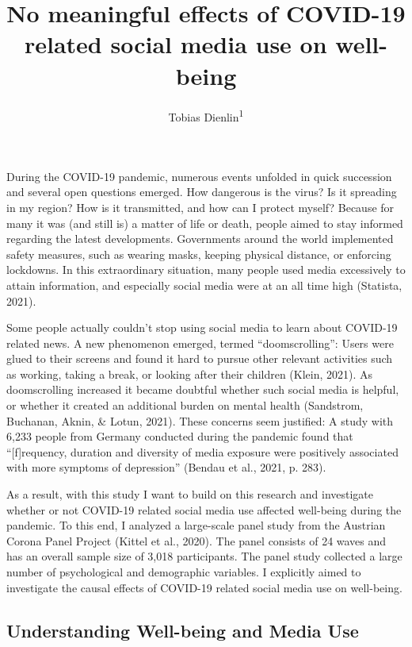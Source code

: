 \documentclass[
  english,
  man,floatsintext]{apa6}
\title{No meaningful effects of COVID-19 related social media use on well-being}
\author{Tobias Dienlin\textsuperscript{1}}
\date{}
\affiliation{\vspace{0.5cm}\textsuperscript{1} University of Vienna}
\begin{document}
\maketitle

During the COVID-19 pandemic,
numerous events unfolded in quick succession and several open questions emerged.
How dangerous is the virus?
Is it spreading in my region?
How is it transmitted, and how can I protect myself?
Because for many it was (and still is) a matter of life or death, people aimed to stay informed regarding the latest developments.
Governments around the world implemented safety measures, such as wearing masks, keeping physical distance, or enforcing lockdowns.
In this extraordinary situation, many people used media excessively to attain information, and especially social media were at an all time high (Statista, 2021).

Some people actually couldn't stop using social media to learn about COVID-19 related news.
A new phenomenon emerged, termed ``doomscrolling'':
Users were glued to their screens and found it hard to pursue other relevant activities such as working, taking a break, or looking after their children (Klein, 2021).
As doomscrolling increased it became doubtful whether such social media is helpful, or whether it created an additional burden on mental health (Sandstrom, Buchanan, Aknin, \& Lotun, 2021).
These concerns seem justified:
A study with 6,233 people from Germany conducted during the pandemic found that ``{[}f{]}requency, duration and diversity of media exposure were positively associated with more symptoms of depression'' (Bendau et al., 2021, p. 283).

As a result, with this study I want to build on this research and investigate whether or not COVID-19 related social media use affected well-being during the pandemic.
To this end, I analyzed a large-scale panel study from the Austrian Corona Panel Project (Kittel et al., 2020).
The panel consists of 24 waves and has an overall sample size of 3,018 participants.
The panel study collected a large number of psychological and demographic variables.
I explicitly aimed to investigate the causal effects of COVID-19 related social media use on well-being.

\hypertarget{understanding-well-being-and-media-use}{%
\subsection{Understanding Well-being and Media Use}\label{understanding-well-being-and-media-use}}
\end{document}
